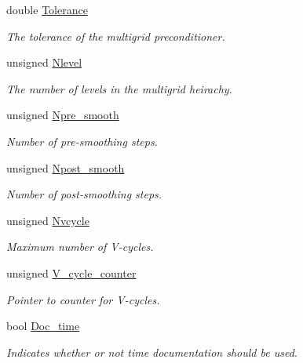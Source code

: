 \begin{DoxyCompactItemize}
double \hyperlink{classoomph_1_1HelmholtzMGPreconditioner_a3d152eb2679cab29ae536c5016111e38}{Tolerance}
\begin{DoxyCompactList}\small\item\em The tolerance of the multigrid preconditioner. \end{DoxyCompactList}\item 
unsigned \hyperlink{classoomph_1_1HelmholtzMGPreconditioner_af9e0d8ee42dc6f596f384cbe0d9ce882}{Nlevel}
\begin{DoxyCompactList}\small\item\em The number of levels in the multigrid heirachy. \end{DoxyCompactList}\item 
unsigned \hyperlink{classoomph_1_1HelmholtzMGPreconditioner_a61acd84465a380527d9b0dc24b85ac42}{Npre\+\_\+smooth}
\begin{DoxyCompactList}\small\item\em Number of pre-\/smoothing steps. \end{DoxyCompactList}\item 
unsigned \hyperlink{classoomph_1_1HelmholtzMGPreconditioner_a752216736f7fcb37f8476cea03916b6e}{Npost\+\_\+smooth}
\begin{DoxyCompactList}\small\item\em Number of post-\/smoothing steps. \end{DoxyCompactList}\item 
unsigned \hyperlink{classoomph_1_1HelmholtzMGPreconditioner_ad7cd9523e0f32e2f882d570db7382d6c}{Nvcycle}
\begin{DoxyCompactList}\small\item\em Maximum number of V-\/cycles. \end{DoxyCompactList}\item 
unsigned \hyperlink{classoomph_1_1HelmholtzMGPreconditioner_ae7ebf565efd370c075ad22688bc2b288}{V\+\_\+cycle\+\_\+counter}
\begin{DoxyCompactList}\small\item\em Pointer to counter for V-\/cycles. \end{DoxyCompactList}\item 
bool \hyperlink{classoomph_1_1HelmholtzMGPreconditioner_a74fc85625ca9007857e14f38c6cbc260}{Doc\+\_\+time}
\begin{DoxyCompactList}\small\item\em Indicates whether or not time documentation should be used. \end{DoxyCompactList}\item 

\end{DoxyCompactItemize}
